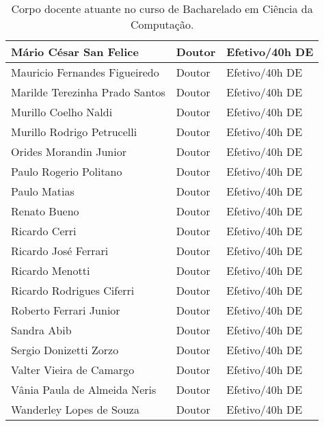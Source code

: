 \begin{table}[!htb]
\begin{tabular}{|l|l|l|}
Mário César San Felice & Doutor & Efetivo/40h DE \\ \hline
Mauricio Fernandes Figueiredo & Doutor & Efetivo/40h DE \\ \hline
Marilde Terezinha Prado Santos & Doutor & Efetivo/40h DE \\ \hline
Murillo Coelho Naldi & Doutor & Efetivo/40h DE \\ \hline
Murillo Rodrigo Petrucelli & Doutor & Efetivo/40h DE \\ \hline
Orides Morandin Junior & Doutor & Efetivo/40h DE \\ \hline
Paulo Rogerio Politano & Doutor & Efetivo/40h DE \\ \hline
Paulo Matias & Doutor & Efetivo/40h DE \\ \hline
Renato Bueno & Doutor & Efetivo/40h DE \\ \hline
Ricardo Cerri & Doutor & Efetivo/40h DE \\ \hline
Ricardo José Ferrari & Doutor & Efetivo/40h DE \\ \hline
Ricardo Menotti & Doutor & Efetivo/40h DE \\ \hline
Ricardo Rodrigues Ciferri & Doutor & Efetivo/40h DE \\ \hline
Roberto Ferrari Junior & Doutor & Efetivo/40h DE \\ \hline
Sandra Abib & Doutor & Efetivo/40h DE \\ \hline
Sergio Donizetti Zorzo & Doutor & Efetivo/40h DE \\ \hline
Valter Vieira de Camargo & Doutor & Efetivo/40h DE \\ \hline
Vânia Paula de Almeida Neris & Doutor & Efetivo/40h DE \\ \hline
Wanderley Lopes de Souza & Doutor & Efetivo/40h DE \\ \hline
\end{tabular}
\caption{Corpo docente atuante no curso de Bacharelado em Ciência da Computação.}
\label{table:CorpoCocente}
\end{table}

